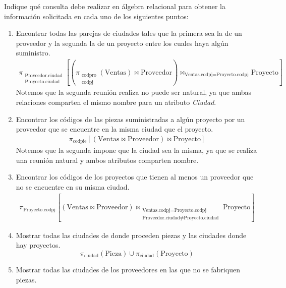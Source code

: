 \begin{ejercicio}
    Indique qué consulta debe realizar en álgebra relacional para obtener la información solicitada en cada uno de los siguientes puntos:
    \begin{enumerate}
        \item Encontrar todas las parejas de ciudades tales que la primera sea la de un proveedor y la segunda la de un proyecto entre los cuales haya algún suministro.
        \begin{align*}
            \pi_{\substack{\text{Proveedor.ciudad}\\\text{Proyecto.ciudad}}}\left[\left(\pi_{\substack{\text{codpro}\\\text{codpj}}}(\text{Ventas})\bowtie \text{Proveedor}\right)\bowtie_{\text{Ventas.codpj}=\text{Proyecto.codpj}} \text{Proyecto}\right]
        \end{align*}
        Notemos que la segunda reunión realiza no puede ser natural, ya que ambas relaciones comparten el mismo nombre para un atributo \emph{Ciudad}.
        \item Encontrar los códigos de las piezas suministradas a algún proyecto por un proveedor que se encuentre en la misma ciudad que el proyecto.
        \begin{align*}
            \pi_{\text{codpie}}\left[\left(\text{Ventas}\bowtie \text{Proveedor}\right)\bowtie \text{Proyecto}\right]
        \end{align*}
        Notemos que la segunda impone que la ciudad sea la misma, ya que se realiza una reunión natural y ambos atributos comparten nombre.
        \item Encontrar los códigos de los proyectos que tienen al menos un proveedor que no se encuentre en su misma ciudad.
        \begin{align*}
            \pi_{\text{Proyecto.codpj}}\left[\left(\text{Ventas}\bowtie \text{Proveedor}\right)\bowtie_{\substack{\text{Ventas.codpj}=\text{Proyecto.codpj}\\\text{Proveedor.ciudad}\neq \text{Proyecto.ciudad}}} \text{Proyecto}\right]
        \end{align*}
        \item Mostrar todas las ciudades de donde proceden piezas y las ciudades donde hay proyectos.
        \begin{equation*}
            \pi_{\text{ciudad}}(\text{Pieza}) \cup \pi_{\text{ciudad}}(\text{Proyecto})
        \end{equation*}
        \item Mostrar todas las ciudades de los proveedores en las que no se fabriquen piezas.

\end{enumerate}
\end{ejercicio}
